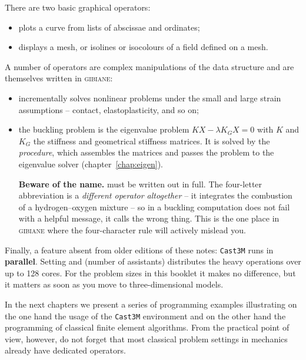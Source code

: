 \noindent There are two basic graphical operators:

\begin{itemize}
\item {}  plots a curve from lists of
  abscissae and ordinates;
\item {}  displays a mesh, or isolines or
  isocolours of a field defined on a mesh.
\end{itemize}

\noindent A number of operators are complex manipulations of the data
structure and are themselves written in \textsc{gibiane}:

\begin{itemize}
\item {} 
  incrementally solves nonlinear problems under the small and large strain
  assumptions -- contact, elastoplasticity, and so on;
\item the buckling problem is the eigenvalue problem $KX-\lambda K_{G}X=0$
  with $K$ and $K_{G}$ the stiffness and geometrical stiffness matrices. It is
  solved by the   \emph{procedure}, which
  assembles the matrices and passes the problem to the eigenvalue solver
  (chapter~\ref{chap:eigen}).

  \medskip
  \textbf{Beware of the name.}  must be written out in full.
  The four-letter abbreviation  is a \emph{different operator
  altogether} -- it integrates the combustion of a hydrogen--oxygen mixture --
  so  in a buckling computation does not fail with a helpful message,
  it calls the wrong thing. This is the one place in \textsc{gibiane} where
  the four-character rule will actively mislead you.
\end{itemize}

\noindent Finally, a feature absent from older editions of these notes:
\texttt{Cast3M} runs in \textbf{parallel}. Setting  and
 (number of assistants) distributes the heavy operations
over up to 128 cores. For the problem sizes in this booklet it makes no
difference, but it matters as soon as you move to three-dimensional models.

In the next chapters we present a series of programming examples illustrating
on the one hand the usage of the \texttt{Cast3M} environment and on the other
hand the programming of classical finite element algorithms. From the
practical point of view, however, do not forget that most classical problem
settings in mechanics already have dedicated operators.

